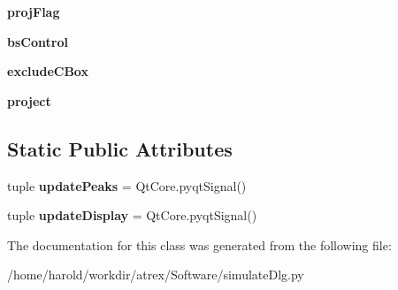 \begin{DoxyCompactItemize}
\item 
\hypertarget{classsimulateDlg_1_1simulateDlg_a6b8afedfdaab0461117c61cde727aa2d}{{\bfseries proj\-Flag}}\label{classsimulateDlg_1_1simulateDlg_a6b8afedfdaab0461117c61cde727aa2d}

\item 
\hypertarget{classsimulateDlg_1_1simulateDlg_a2b03e2e70fbf25c638c1e0466a2de38f}{{\bfseries bs\-Control}}\label{classsimulateDlg_1_1simulateDlg_a2b03e2e70fbf25c638c1e0466a2de38f}

\item 
\hypertarget{classsimulateDlg_1_1simulateDlg_a2adb9273893575b3120e8878a99983d4}{{\bfseries exclude\-C\-Box}}\label{classsimulateDlg_1_1simulateDlg_a2adb9273893575b3120e8878a99983d4}

\item 
\hypertarget{classsimulateDlg_1_1simulateDlg_a723b0e1c3aa3f071ae84ec39a1558845}{{\bfseries project}}\label{classsimulateDlg_1_1simulateDlg_a723b0e1c3aa3f071ae84ec39a1558845}

\end{DoxyCompactItemize}
\subsection*{Static Public Attributes}
\begin{DoxyCompactItemize}
\item 
\hypertarget{classsimulateDlg_1_1simulateDlg_a14c3146ee7422f53d8488a114344800e}{tuple {\bfseries update\-Peaks} = Qt\-Core.\-pyqt\-Signal()}\label{classsimulateDlg_1_1simulateDlg_a14c3146ee7422f53d8488a114344800e}

\item 
\hypertarget{classsimulateDlg_1_1simulateDlg_a1c6d77c7b4759cb95a7fbdd5a7ca23d7}{tuple {\bfseries update\-Display} = Qt\-Core.\-pyqt\-Signal()}\label{classsimulateDlg_1_1simulateDlg_a1c6d77c7b4759cb95a7fbdd5a7ca23d7}

\end{DoxyCompactItemize}


The documentation for this class was generated from the following file\-:\begin{DoxyCompactItemize}
\item 
/home/harold/workdir/atrex/\-Software/simulate\-Dlg.\-py\end{DoxyCompactItemize}
